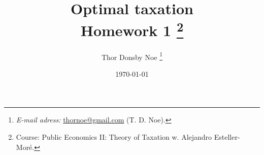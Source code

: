\titlehead{ \centering\texttt{[image: 03\_figures/logo]}}

\title{\Huge Optimal taxation %
\\ \huge Homework 1 %
\thanks{Course: Public Economics II: Theory of Taxation w. Alejandro Esteller-Moré.
}
}

\author[a]{Thor Donsby Noe
\thanks{ %
\textit{E-mail adress:} \href{mailto:thornoe@gmail.com}{thornoe@gmail.com} (T. D. Noe).}
}

\date{\normalsize \today %
  }

%         
